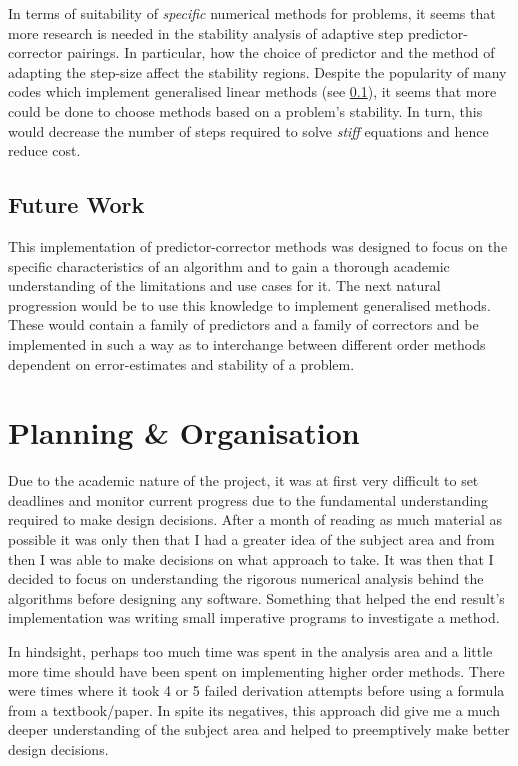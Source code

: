 \documentclass[12pt, twoside]{report}
\theoremstyle{plain}
\theoremstyle{definition}
\theoremstyle{definition}
\begin{document}
        In terms of suitability of \textit{specific} numerical methods for problems, it
        seems that more research is needed in the stability analysis of adaptive step 
        predictor-corrector pairings. In particular, how the choice of predictor and the 
        method of adapting the step-size affect the stability regions. Despite the popularity
        of many codes which implement generalised linear methods (see \ref{future}), it seems
        that more could be done to choose methods based on a problem's stability. In turn,
        this would decrease the number of steps required to solve \textit{stiff} equations
        and hence reduce cost.

        \subsection{Future Work}
        \label{future}
            This implementation of predictor-corrector methods was designed to focus 
            on the specific characteristics
            of an algorithm and to gain a thorough academic understanding of the limitations and 
            use cases for it. The next natural progression would be to use this 
            knowledge to implement generalised methods. These would contain a family of 
            predictors and a family of correctors and be implemented in such a way as to interchange
            between different order methods dependent on error-estimates and stability of a problem.

    \section{Planning \& Organisation}
        Due to the academic nature of the project, it was at first very difficult to set deadlines
        and monitor current progress due to the fundamental understanding required to make design decisions. 
        After a month of reading as much material as possible it was 
        only then that I had a greater idea of the subject area and from then I was able
        to make decisions on what approach to take. It was then that I decided to focus on 
        understanding the rigorous numerical analysis behind the algorithms before designing any software. 
        Something that helped the end result's implementation was writing small imperative programs
        to investigate a method.

        In hindsight, perhaps too much time was spent in the analysis area and a little more time should have
        been spent on implementing higher order methods. There were times where 
        it took 4 or 5 failed derivation attempts before using a formula from a textbook/paper.
        In spite its negatives, this approach did give me a much deeper understanding 
        of the subject area and helped to preemptively make better design decisions. 
\end{document}
